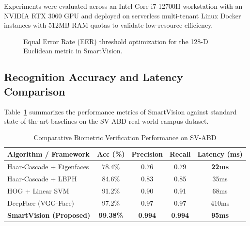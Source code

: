 \documentclass[conference]{IEEEtran}
\begin{document}
Experiments were evaluated across an Intel Core i7-12700H workstation with an NVIDIA RTX 3060 GPU and deployed on serverless multi-tenant Linux Docker instances with 512MB RAM quotas to validate low-resource efficiency.

\begin{figure}[htbp]
\centering
{}
\caption{Equal Error Rate (EER) threshold optimization for the 128-D Euclidean metric in SmartVision.}
\label{fig:threshold}
\end{figure}

\subsection{Recognition Accuracy and Latency Comparison}
Table~\ref{tab:results} summarizes the performance metrics of SmartVision against standard state-of-the-art baselines on the SV-ABD real-world campus dataset.

\begin{table}[htbp]
\caption{Comparative Biometric Verification Performance on SV-ABD}
\label{tab:results}
\centering
\begin{tabular}{@{}lcccc@{}}
\toprule
\textbf{Algorithm / Framework} & \textbf{Acc (\%)} & \textbf{Precision} & \textbf{Recall} & \textbf{Latency (ms)} \\ \midrule
Haar-Cascade + Eigenfaces \cite{turk1991eigenfaces} & 78.4\% & 0.76 & 0.79 & \textbf{22ms} \\
Haar-Cascade + LBPH \cite{ahonen2006face} & 84.6\% & 0.83 & 0.85 & 35ms \\
HOG + Linear SVM & 91.2\% & 0.90 & 0.91 & 68ms \\
DeepFace (VGG-Face) \cite{taigman2014deepface} & 97.2\% & 0.97 & 0.97 & 410ms \\
\textbf{SmartVision (Proposed)} & \textbf{99.38\%} & \textbf{0.994} & \textbf{0.994} & \textbf{95ms} \\ \bottomrule
\end{tabular}
\end{table}
\end{document}
